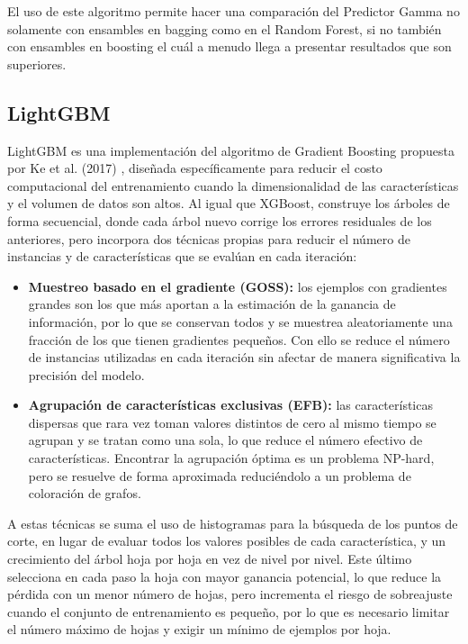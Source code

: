 El uso de este algoritmo permite hacer una comparación del Predictor Gamma no solamente con ensambles en bagging como en el Random Forest, si no también con ensambles en boosting el cuál a menudo llega a presentar resultados que son superiores.

\subsection{LightGBM}

LightGBM es una implementación del algoritmo de Gradient Boosting propuesta por Ke et al. (2017) \cite{ke2017}, diseñada específicamente para reducir el costo computacional del entrenamiento cuando la dimensionalidad de las características y el volumen de datos son altos. Al igual que XGBoost, construye los árboles de forma secuencial, donde cada árbol nuevo corrige los errores residuales de los anteriores, pero incorpora dos técnicas propias para reducir el número de instancias y de características que se evalúan en cada iteración:

\begin{itemize}
    \item \textbf{Muestreo basado en el gradiente (GOSS):} los ejemplos con gradientes grandes son los que más aportan a la estimación de la ganancia de información, por lo que se conservan todos y se muestrea aleatoriamente una fracción de los que tienen gradientes pequeños. Con ello se reduce el número de instancias utilizadas en cada iteración sin afectar de manera significativa la precisión del modelo.

    \item \textbf{Agrupación de características exclusivas (EFB):} las características dispersas que rara vez toman valores distintos de cero al mismo tiempo se agrupan y se tratan como una sola, lo que reduce el número efectivo de características. Encontrar la agrupación óptima es un problema NP-hard, pero se resuelve de forma aproximada reduciéndolo a un problema de coloración de grafos.
\end{itemize}

A estas técnicas se suma el uso de histogramas para la búsqueda de los puntos de corte, en lugar de evaluar todos los valores posibles de cada característica, y un crecimiento del árbol hoja por hoja en vez de nivel por nivel. Este último selecciona en cada paso la hoja con mayor ganancia potencial, lo que reduce la pérdida con un menor número de hojas, pero incrementa el riesgo de sobreajuste cuando el conjunto de entrenamiento es pequeño, por lo que es necesario limitar el número máximo de hojas y exigir un mínimo de ejemplos por hoja.\\[.15cm]

